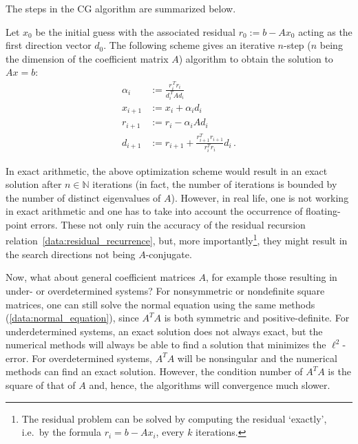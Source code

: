     The steps in the CG algorithm are summarized below.
    \begin{method}
        Let $x_0$ be the initial guess with the associated residual $r_0:=b-Ax_0$ acting as the first direction vector $d_0$. The following scheme gives an iterative $n$-step ($n$ being the dimension of the coefficient matrix $A$) algorithm to obtain the solution to $Ax=b$:
        \begin{align}
            \alpha_i &:= \frac{r_i^{\,T}r_i}{d_i^{\,T}\!Ad_i}\\
            x_{i+1} &:= x_i+\alpha_id_i\\
            r_{i+1} &:= r_i-\alpha_iAd_i\label{data:residual_recurrence}\\
            d_{i+1} &:= r_{i+1}+\frac{r_{i+1}^Tr_{i+1}}{r_i^Tr_i}d_i\,.\label{data:beta}
        \end{align}
    \end{method}

    \begin{remark}
        In exact arithmetic, the above optimization scheme would result in an exact solution after $n\in\mathbb{N}$ iterations (in fact, the number of iterations is bounded by the number of distinct eigenvalues of $A$). However, in real life, one is not working in exact arithmetic and one has to take into account the occurrence of floating-point errors. These not only ruin the accuracy of the residual recursion relation~\eqref{data:residual_recurrence}, but, more importantly\footnote{The residual problem can be solved by computing the residual `exactly', i.e.~by the formula $r_i=b-Ax_i$, every $k$ iterations.}, they might result in the search directions not being $A$-conjugate.
    \end{remark}

    Now, what about general coefficient matrices $A$, for example those resulting in under- or overdetermined systems? For nonsymmetric or nondefinite square matrices, one can still solve the normal equation using the same methods (\cref{data:normal_equation}), since $A^T\!A$ is both symmetric and positive-definite. For underdetermined systems, an exact solution does not always exact, but the numerical methods will always be able to find a solution that minimizes the $\ell^2$-error. For overdetermined systems, $A^T\!A$ will be nonsingular and the numerical methods can find an exact solution. However, the condition number of $A^T\!A$ is the square of that of $A$ and, hence, the algorithms will convergence much slower.

